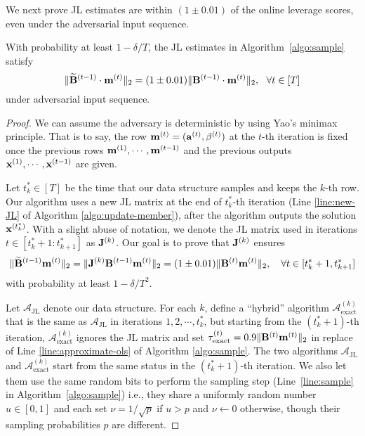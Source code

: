 We next prove JL estimates are within $(1\pm 0.01)$ of the online leverage scores, even under the adversarial input sequence.

\begin{lemma}\label{lem:JL_estimates}
With probability at least $1-\delta/T$, the JL estimates in Algorithm~\ref{algo:sample} satisfy
\[
\|\widetilde{\mathbf{B}}^{(t-1)} \cdot \mathbf{m}^{(t)}\|_2 = (1 \pm 0.01) \|\mathbf{B}^{(t-1)} \cdot \mathbf{m}^{(t)}\|_2, ~~ \forall t \in [T]
\]
under adversarial input sequence.
\end{lemma}
\begin{proof}
We can assume the adversary is deterministic by using Yao's minimax principle. That is to say, the row $\mathbf{m}^{(t)} = (\mathbf{a}^{(t)}, \beta^{(t)})$ at the $t$-th iteration is fixed once the previous rows $\mathbf{m}^{(1)}, \cdots, \mathbf{m}^{(t-1)}$ and the previous outputs $\mathbf{x}^{(1)}, \cdots, \mathbf{x}^{(t-1)}$ are given.

Let $t^*_k \in [T]$ be the time that our data structure samples and keeps the $k$-th row. 
Our algorithm uses a new JL matrix at the end of $t^*_k$-th iteration (Line \ref{line:new-JL} of Algorithm \ref{algo:update-member}), after the algorithm outputs the solution $\mathbf{x}^{(t^*_k)}$. 
With a slight abuse of notation, we denote the JL matrix used in iterations $t \in [t^*_k+1: t^*_{k+1}]$ as $\mathbf{J}^{(k)}$.  Our goal is to prove that $\mathbf{J}^{(k)}$ ensures
\[
\|\widetilde{\mathbf{B}}^{(t-1)}\mathbf{m}^{(t)}\|_2 =  \|\mathbf{J}^{(k)}\mathbf{B}^{(t-1)}\mathbf{m}^{(t)}\|_2 = (1\pm 0.01)\|\mathbf{B}^{(t)}\mathbf{m}^{(t)}\|_2, \quad \forall t \in [t^*_k+1, t^*_{k+1}]
\]
with probability at least $1- \delta/T^2$.


Let $\mathcal{A}_{\text{JL}}$ denote our data structure. 
For each $k$, define a ``hybrid'' algorithm $\mathcal{A}_{\text{exact}}^{(k)}$ that is the same as $\mathcal{A}_{\text{JL}}$ in iterations $1, 2, \cdots, t^*_k$, but starting from the $(t^*_k + 1)$-th iteration, $\mathcal{A}_{\text{exact}}^{(k)}$ ignores the JL matrix and set $\tau^{(t)}_{\text{exact}} = 0.9 \|\mathbf{B}^{(t)} \mathbf{m}^{(t)}\|_2$ in replace of Line \ref{line:approximate-ols} of Algorithm \ref{algo:sample}. 
The two algorithms $\mathcal{A}_{\text{JL}}$ and $\mathcal{A}_{\text{exact}}^{(k)}$ start from the same status in the $(t^*_k+1)$-th iteration. 
We also let them use the same random bits to perform the sampling step (Line~\ref{line:sample} in Algorithm~\ref{algo:sample})  
i.e., they share a uniformly random number $u \in [0,1]$ and each set $\nu = 1/\sqrt{p}$ if $u > p$ and $\nu \leftarrow 0$ otherwise, though their sampling probabilities $p$ are different.


\end{proof}
